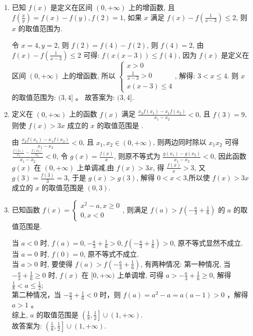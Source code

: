 \begin{enumerate}
\item 已知 $f(x)$ 是定义在区间 $(0,+\infty)$ 上的增函数, 且 $f\left(\frac{x}{y}\right)=f(x)-f(y), f(2)=1$, 如果 $x$ 满足 $f(x)-f\left(\frac{1}{x-3}\right) \leq 2$, 则 $x$ 的取值范围为\blkda{$(3,4]$}.
\begin{jieda}
令 $x=4, y=2$, 则 $f(2)=f(4)-f(2)$, 则 $f(4)=2$,
由 $f(x)-f\left(\frac{1}{x-3}\right) \leq 2$ 可得: $f(x(x-3)) \leq f(4)$,
因为 $f(x)$ 是定义在区间 $(0,+\infty)$ 上的增函数,
所以 $\left\{\begin{array}{l}x>0 \\ \frac{1}{x-3}>0 \\ x(x-3) \leq 4\end{array}\right.$, 解得: $3<x \leq 4$.
则 $x$ 的取值范围为: $(3,4]$ 。
故答案为: $(3,4]$.
\end{jieda}


\item 定义在 $(0,+\infty)$ 上的函数 $f(x)$ 满足 $\frac{x_{2} f\left(x_{1}\right)-x_{1} f\left(x_{2}\right)}{x_{1}-x_{2}}<0$, 且 $f(3)=9$, 则使 $f(x)>3 x$ 成立的 $x$ 的取值范围是 .
\begin{jieda}
由 $\frac{x_{2} f\left(x_{1}\right)-x_{1} f\left(x_{2}\right)}{x_{1}-x_{2}}<0$, 且 $x_{1}, x_{2} \in(0,+\infty)$, 则两边同时除以 $x_{1} x_{2}$ 可得 $\frac{\frac{f\left(x_{1}\right)}{x_{1}}-\frac{f\left(x_{2}\right)}{x_{2}}}{x_{1}-x_{2}}<0$,
令 $g(x)=\frac{f(x)}{x}$, 则原不等式为 $\frac{g\left(x_{1}\right)-g\left(x_{2}\right)}{x_{1}-x_{2}}<0$, 因此函数 $g(x)$ 在 $(0,+\infty)$ 上单调减,由 $f(x)>3 x$, 得 $\frac{f(x)}{x}>3$, 又 $g(3)=\frac{f(3)}{3}=3$, 于是 $g(x)>g(3)$, 解得 $0<x<3$,所以使 $f(x)>3 x$ 成立的 $x$ 的取值范围是 $(0,3)$.
\end{jieda}


\item 已知函数 $f(x)=\left\{\begin{array}{l}x^{2}-a, x \geq 0 \\ 0, x<0\end{array}\right.$, 则满足 $f(a)>f\left(-\frac{a}{3}+\frac{1}{6}\right)$ 的 $a$ 的取值范围是\blkda[4]{$\left(\frac{1}{8}, \frac{1}{2}\right] \cup(1,+\infty)$}.
\begin{jieda}
当 $a<0$ 时, $f(a)=0,-\frac{a}{3}+\frac{1}{6}>0, f\left(-\frac{a}{3}+\frac{1}{6}\right)>0$, 原不等式显然不成立.\\
当 $a=0$ 时, $f(0)=0$, 原不等式不成立.\\
当 $a>0$ 时, 要使得 $f(a)>f\left(-\frac{a}{3}+\frac{1}{6}\right)$, 有两种情况:
第一种情况, 当 $-\frac{a}{3}+\frac{1}{6} \geq 0$ 时, $f(x)$ 在 $[0,+\infty)$ 上单调增, 可得 $a>-\frac{a}{3}+\frac{1}{6} \geq 0$, 解得 $\frac{1}{8}<a \leq \frac{1}{2} ;$\\
第二种情况，当 $-\frac{a}{3}+\frac{1}{6}<0$ 时，则 $f(a)=a^{2}-a=a(a-1)>0$ ，解得 $a>1$ 。\\
综上, $a$ 的取值范围是 $\left(\frac{1}{8}, \frac{1}{2}\right] \cup(1,+\infty)$.\\
故答案为: $\left(\frac{1}{8}, \frac{1}{2}\right] \cup(1,+\infty)$.
\end{jieda}


\end{enumerate}
